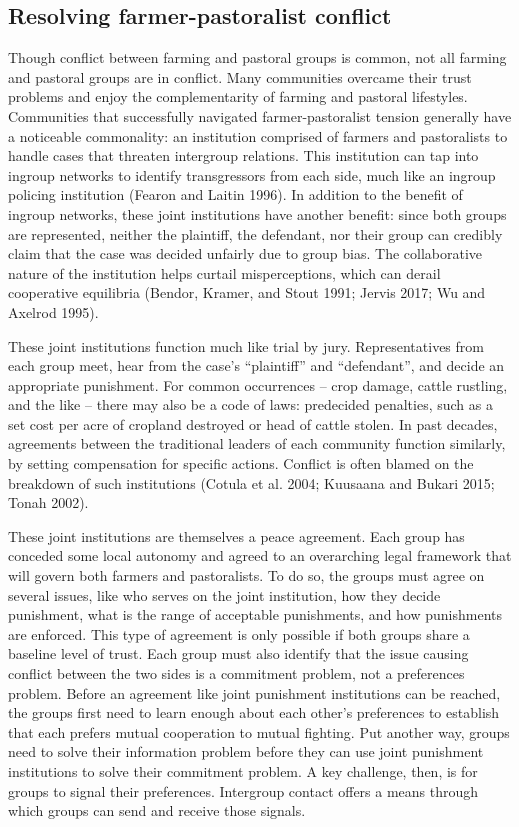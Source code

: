 \documentclass[11pt]{article}
\begin{document}
\hypertarget{resolving-farmer-pastoralist-conflict}{%
\subsection{Resolving farmer-pastoralist
conflict}\label{resolving-farmer-pastoralist-conflict}}

Though conflict between farming and pastoral groups is common, not all
farming and pastoral groups are in conflict. Many communities overcame
their trust problems and enjoy the complementarity of farming and
pastoral lifestyles. Communities that successfully navigated
farmer-pastoralist tension generally have a noticeable commonality: an
institution comprised of farmers and pastoralists to handle cases that
threaten intergroup relations. This institution can tap into ingroup
networks to identify transgressors from each side, much like an ingroup
policing institution (Fearon and Laitin 1996). In addition to the
benefit of ingroup networks, these joint institutions have another
benefit: since both groups are represented, neither the plaintiff, the
defendant, nor their group can credibly claim that the case was decided
unfairly due to group bias. The collaborative nature of the institution
helps curtail misperceptions, which can derail cooperative equilibria
(Bendor, Kramer, and Stout 1991; Jervis 2017; Wu and Axelrod 1995).

These joint institutions function much like trial by jury.
Representatives from each group meet, hear from the case's ``plaintiff''
and ``defendant'', and decide an appropriate punishment. For common
occurrences -- crop damage, cattle rustling, and the like -- there may
also be a code of laws: predecided penalties, such as a set cost per
acre of cropland destroyed or head of cattle stolen. In past decades,
agreements between the traditional leaders of each community function
similarly, by setting compensation for specific actions. Conflict is
often blamed on the breakdown of such institutions (Cotula et al. 2004;
Kuusaana and Bukari 2015; Tonah 2002).

These joint institutions are themselves a peace agreement. Each group
has conceded some local autonomy and agreed to an overarching legal
framework that will govern both farmers and pastoralists. To do so, the
groups must agree on several issues, like who serves on the joint
institution, how they decide punishment, what is the range of acceptable
punishments, and how punishments are enforced. This type of agreement is
only possible if both groups share a baseline level of trust. Each group
must also identify that the issue causing conflict between the two sides
is a commitment problem, not a preferences problem. Before an agreement
like joint punishment institutions can be reached, the groups first need
to learn enough about each other's preferences to establish that each
prefers mutual cooperation to mutual fighting. Put another way, groups
need to solve their information problem before they can use joint
punishment institutions to solve their commitment problem. A key
challenge, then, is for groups to signal their preferences. Intergroup
contact offers a means through which groups can send and receive those
signals.
\end{document}
